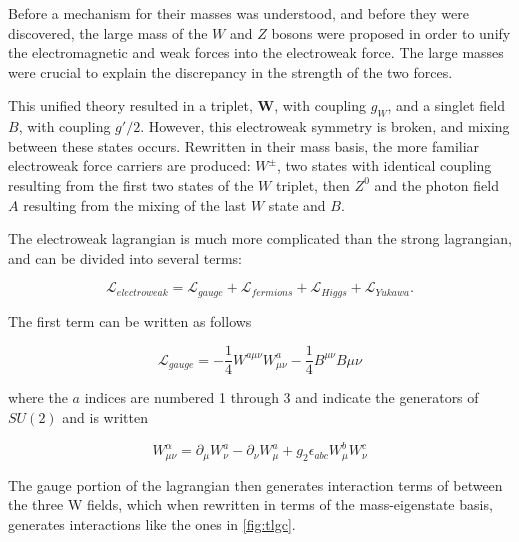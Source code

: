 Before a mechanism for their masses was understood, and before they were discovered, the large mass of the $W$ and $Z$ bosons were proposed in order to unify the electromagnetic and weak forces into the electroweak force. The large masses were crucial to explain the discrepancy in the strength of the two forces. 

This unified theory resulted in a triplet, $\bm{W}$, with coupling $g_W$, and a singlet field $B$, with coupling $g'/2$. However, this electroweak symmetry is broken, and mixing between these states occurs. Rewritten in their mass basis, the more familiar electroweak force carriers are produced: $W^\pm$, two states with identical coupling resulting from the first two states of the $W$ triplet, then $Z^0$ and the photon field $A$ resulting from the mixing of the last $W$ state and $B$. 

The electroweak lagrangian is much more complicated than the strong lagrangian, and can be divided into several terms:

\begin{equation}
\mathcal{L}_{electroweak} = \mathcal{L}_{gauge} + \mathcal{L}_{fermions} + \mathcal{L}_{Higgs} + \mathcal{L}_{Yukawa} .
\end{equation}

The first term can be written as follows

\begin{equation}
\mathcal{L}_{gauge} = -\frac{1}{4}W^{a\mu\nu}W^a_{\mu\nu} - \frac{1}{4}B^{\mu\nu}B{\mu\nu} 
\end{equation}

where the $a$ indices are numbered 1 through 3 and indicate the generators of $SU(2)$ and is written 

\begin{equation}
W^\alpha_{\mu\nu} = \partial_\mu W^a_\nu - \partial_\nu W^a_\mu + g_2 \epsilon_{abc} W^b_\mu W^c_\nu
\end{equation}

The gauge portion of the lagrangian then generates interaction terms of between the three W fields, which when rewritten in terms of the mass-eigenstate basis, generates interactions like the ones in \autoref{fig:tlgc}.


